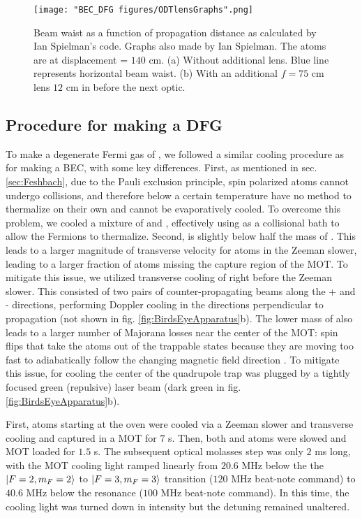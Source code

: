 \begin{figure}
	\texttt{[image: "BEC\_DFG figures/ODTlensGraphs".png]}
\caption[Beam waist as a function of propagation distance]{Beam waist as a function of propagation distance as calculated by Ian Spielman's code.  Graphs also made by Ian Spielman. The atoms are at displacement = $140$ cm. (a) Without additional lens. Blue line represents horizontal beam waist. (b) With an additional $f=75$ cm lens $12$ cm in before the next optic. }
\label{fig:ODTlensGraphs}
\end{figure}

\subsection{Procedure for making a DFG}\label{sec:DFGsequence}

To make a degenerate Fermi gas of \K{}, we followed a similar cooling procedure as for making a BEC, with some key differences. First, as mentioned in sec. \ref{sec:Feshbach}, due to the Pauli exclusion principle, spin polarized \K{} atoms cannot undergo \swave{}  collisions, and therefore below a certain temperature have no method to thermalize on their own and cannot be evaporatively cooled. To overcome this problem, we cooled a mixture of \Rb{} and \K{}, effectively using \Rb{} as a collisional bath to allow the Fermions to thermalize. Second, \K{} is slightly below half the mass of \Rb. This leads to a larger magnitude of transverse velocity for \K{} atoms in the Zeeman slower, leading to a larger fraction of atoms missing the capture region of the MOT. To mitigate this issue, we utilized transverse cooling of \K{} right before the Zeeman slower. This consisted of two pairs of counter-propagating beams along the \ez{}+\ey{} and \ez{}-\ey{} directions, performing Doppler cooling in the directions perpendicular to propagation (not shown in fig. \ref{fig:BirdsEyeApparatus}b). The lower mass of \K{} also leads to a larger number of Majorana losses near the center of the MOT: spin flips that take the atoms out of the trappable states because they are moving too fast to adiabatically follow the changing magnetic field direction \cite{Majorana1932,Sukumar1997, Brink2006}. To mitigate this issue, for cooling \K{} the center of the quadrupole trap was plugged by a tightly focused green (repulsive) laser beam (dark green in fig. \ref{fig:BirdsEyeApparatus}b).

First, \K{} atoms starting at the oven were cooled via a Zeeman slower and transverse cooling and captured in a MOT for $7$ s. Then, both \K{} and \Rb{} atoms were slowed and MOT loaded for $1.5$ s. The subsequent optical molasses step was only $2$ ms long, with the \Rb{} MOT cooling light ramped linearly from $20.6$ MHz below the the $\mathinner{|{F=2,m_F=2}\rangle}$ to $\mathinner{|{F=3,m_F=3}\rangle}$ transition ($120$ MHz beat-note command) to $40.6$ MHz below the resonance ($100$ MHz beat-note command). In this time, the \K{} cooling light was turned down in intensity but the detuning remained unaltered.

